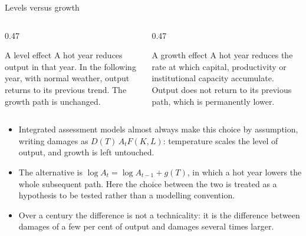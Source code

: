 \documentclass[aspectratio=169,10pt]{beamer}
\begin{document}
\begin{frame}{Levels versus growth}
  \begin{columns}[T]
    \begin{column}{0.47\textwidth}
      \begin{block}{A level effect}
        \small A hot year reduces output in that year. In the following year, with
        normal weather, output returns to its previous trend. The growth path is
        unchanged.
      \end{block}
    \end{column}
    \begin{column}{0.47\textwidth}
      \begin{block}{A growth effect}
        \small A hot year reduces the rate at which capital, productivity or
        institutional capacity accumulate. Output does not return to its previous
        path, which is permanently lower.
      \end{block}
    \end{column}
  \end{columns}
  \vspace{6pt}
  \begin{itemize}
    \item Integrated assessment models almost always make this choice by assumption,
          writing damages as $D(T)\,A_t F(K,L)$: temperature scales the level of
          output, and growth is left untouched.
    \item The alternative is $\log A_t = \log A_{t-1} + g(T)$, in which a hot year
          lowers the whole subsequent path. Here the choice between the two is
          treated as a hypothesis to be tested rather than a modelling convention.
    \item Over a century the difference is not a technicality: it is the difference
          between damages of a few per cent of output and damages several times
          larger.
  \end{itemize}
\end{frame}
\end{document}
